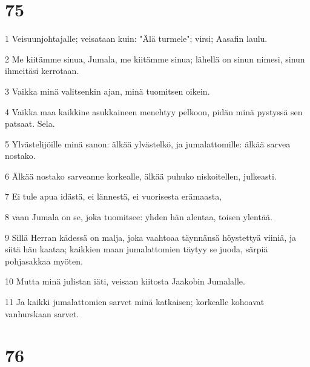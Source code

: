 \chapter{75}

\par 1 Veisuunjohtajalle; veisataan kuin: "Älä turmele"; virsi; Aasafin laulu.
\par 2 Me kiitämme sinua, Jumala, me kiitämme sinua; lähellä on sinun nimesi, sinun ihmeitäsi kerrotaan.
\par 3 Vaikka minä valitsenkin ajan, minä tuomitsen oikein.
\par 4 Vaikka maa kaikkine asukkaineen menehtyy pelkoon, pidän minä pystyssä sen patsaat. Sela.
\par 5 Ylvästelijöille minä sanon: älkää ylvästelkö, ja jumalattomille: älkää sarvea nostako.
\par 6 Älkää nostako sarveanne korkealle, älkää puhuko niskoitellen, julkeasti.
\par 7 Ei tule apua idästä, ei lännestä, ei vuorisesta erämaasta,
\par 8 vaan Jumala on se, joka tuomitsee: yhden hän alentaa, toisen ylentää.
\par 9 Sillä Herran kädessä on malja, joka vaahtoaa täynnänsä höystettyä viiniä, ja siitä hän kaataa; kaikkien maan jumalattomien täytyy se juoda, särpiä pohjasakkaa myöten.
\par 10 Mutta minä julistan iäti, veisaan kiitosta Jaakobin Jumalalle.
\par 11 Ja kaikki jumalattomien sarvet minä katkaisen; korkealle kohoavat vanhurskaan sarvet.

\chapter{76}

